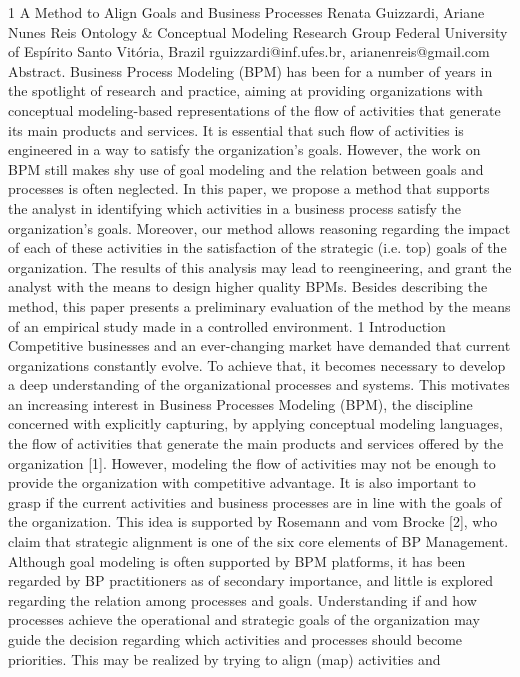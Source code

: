 1
A Method to Align Goals and Business Processes
Renata Guizzardi, Ariane Nunes Reis
Ontology & Conceptual Modeling Research Group
Federal University of Espírito Santo
Vitória, Brazil
rguizzardi@inf.ufes.br, arianenreis@gmail.com
Abstract. Business Process Modeling (BPM) has been for a number of years in
the spotlight of research and practice, aiming at providing organizations with
conceptual modeling-based representations of the flow of activities that generate
its main products and services. It is essential that such flow of activities is engineered in a way to satisfy the organization’s goals. However, the work on BPM
still makes shy use of goal modeling and the relation between goals and processes
is often neglected. In this paper, we propose a method that supports the analyst
in identifying which activities in a business process satisfy the organization’s
goals. Moreover, our method allows reasoning regarding the impact of each of
these activities in the satisfaction of the strategic (i.e. top) goals of the organization. The results of this analysis may lead to reengineering, and grant the analyst
with the means to design higher quality BPMs. Besides describing the method,
this paper presents a preliminary evaluation of the method by the means of an
empirical study made in a controlled environment.
1 Introduction
Competitive businesses and an ever-changing market have demanded that current organizations constantly evolve. To achieve that, it becomes necessary to develop a deep
understanding of the organizational processes and systems. This motivates an increasing interest in Business Processes Modeling (BPM), the discipline concerned with explicitly capturing, by applying conceptual modeling languages, the flow of activities
that generate the main products and services offered by the organization [1].
However, modeling the flow of activities may not be enough to provide the organization with competitive advantage. It is also important to grasp if the current activities
and business processes are in line with the goals of the organization. This idea is supported by Rosemann and vom Brocke [2], who claim that strategic alignment is one of
the six core elements of BP Management. Although goal modeling is often supported
by BPM platforms, it has been regarded by BP practitioners as of secondary importance, and little is explored regarding the relation among processes and goals.
Understanding if and how processes achieve the operational and strategic goals of
the organization may guide the decision regarding which activities and processes
should become priorities. This may be realized by trying to align (map) activities and
